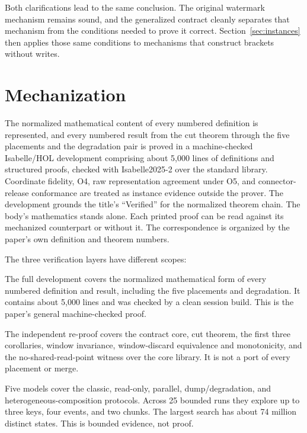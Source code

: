 \documentclass[sigconf,nonacm,10pt]{acmart}
\theoremstyle{plain}
\theoremstyle{definition}
\begin{document}
Both clarifications lead to the same conclusion. The original watermark 
mechanism remains sound, and the generalized contract cleanly separates that 
mechanism from the conditions needed to prove it correct. 
Section~\ref{sec:instances} then applies those same conditions to mechanisms 
that construct brackets without writes.

\section{Mechanization}\label{sec:mech}

The normalized mathematical content of every numbered definition is
represented, and every numbered result from the cut theorem through the
five placements and the degradation pair is proved in a machine-checked
Isabelle/HOL development comprising about 5{,}000 lines of definitions and
structured proofs, checked with Isabelle2025-2
over the standard library. Coordinate fidelity, O4, raw representation
agreement under O5, and connector-release conformance are treated as 
instance evidence outside the prover. The development grounds the
title's ``Verified'' for the normalized theorem chain. The body's mathematics
stands alone. Each printed proof can be read against its mechanized
counterpart or without it. The correspondence is organized by the
paper's own definition and theorem numbers.

The three verification layers have different scopes:
\begin{description}
\RaggedRight
\item[Isabelle/HOL.] The full development covers the normalized
mathematical form of every numbered definition and result, including
the five placements and degradation. It contains about 5{,}000 lines and was checked by a clean session
build. This is the paper's general machine-checked proof.
\item[Lean~4.] The independent re-proof covers the contract core,
cut theorem, the first three corollaries, window invariance,
window-discard equivalence and monotonicity, and the
no-shared-read-point witness over the core library. It is not a port of
every placement or merge.
\item[TLA\textsuperscript{+}/TLC.] Five models cover the classic,
read-only, parallel, dump/degradation, and heterogeneous-composition
protocols. Across 25 bounded runs they explore up to three
keys, four events, and two chunks. The largest search has about 74
million distinct states. This is bounded evidence, not proof.
\end{description}
\end{document}
